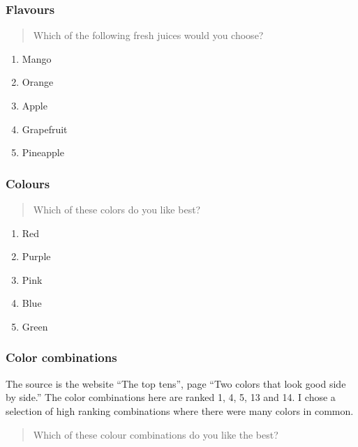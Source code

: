 \documentclass[11pt,letter]{amsart}
\begin{document}
\subsubsection{Flavours}

\begin{quotation}
Which of the following fresh juices would you choose?
\end{quotation}

\begin{enumerate}
\item Mango 

\item Orange 

\item Apple 

\item Grapefruit 

\item Pineapple
\end{enumerate}

\subsubsection{Colours}

\begin{quotation}
Which of these colors do you like best?
\end{quotation}

\begin{enumerate}
\item Red 

\item Purple 

\item Pink 

\item Blue 

\item Green
\end{enumerate}

\subsubsection{Color combinations}

The source is the website ``The top tens'', page ``Two colors that look good
side by side.'' The color combinations here are ranked 1, 4, 5, 13 and 14. I
chose a selection of high ranking combinations where there were many colors
in common.

\begin{quotation}
Which of these colour combinations do you like the best?
\end{quotation}
\end{document}
